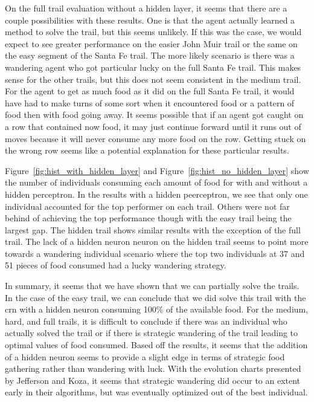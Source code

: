 On the full trail evaluation without a hidden layer, it seems that there are a couple possibilities with these results. One is that the agent actually learned a method to solve the trail, but this seems unlikely. If this was the case, we would expect to see greater performance on the easier John Muir trail or the same on the easy segment of the Santa Fe trail. The more likely scenario is there was a wandering agent who got particular lucky on the full Santa Fe trail. This makes sense for the other trails, but this does not seem consistent in the medium trail. For the agent to get as much food as it did on the full Santa Fe trail, it would have had to make turns of some sort when it encountered food or a pattern of food then with food going away. It seems possible that if an agent got caught on a row that contained now food, it may just continue forward until it runs out of moves because it will never consume any more food on the row. Getting stuck on the wrong row seems like a potential explanation for these particular results.

Figure~\ref{fig:hist_with_hidden_layer} and Figure~\ref{fig:hist_no_hidden_layer} show the number of individuals consuming each amount of food for with and without a hidden perceptron. In the results with a hidden peerceptron, we see that only one individual accounted for the top performer on each trail. Others were not far behind of achieving the top performance though with the easy trail being the largest gap. The hidden trail shows similar results with the exception of the full trail. The lack of a hidden neuron neuron on the hidden trail seems to point more towards a wandering individual scenario where the top two individuals at 37 and 51 pieces of food consumed had a lucky wandering strategy.

In summary, it seems that we have shown that we can partially solve the trails. In the case of the easy trail, we can conclude that we did solve this trail with the \gls{crn} with a hidden neuron consuming 100\% of the available food. For the medium, hard, and full trails, it is difficult to conclude if there was an individual who actually solved the trail or if there is strategic wandering of the trail leading to optimal values of food consumed. Based off the results, it seems that the addition of a hidden neuron seems to provide a slight edge in terms of strategic food gathering rather than wandering with luck. With the evolution charts presented by Jefferson and Koza, it seems that strategic wandering did occur to an extent early in their algorithms, but was eventually optimized out of the best individual.

